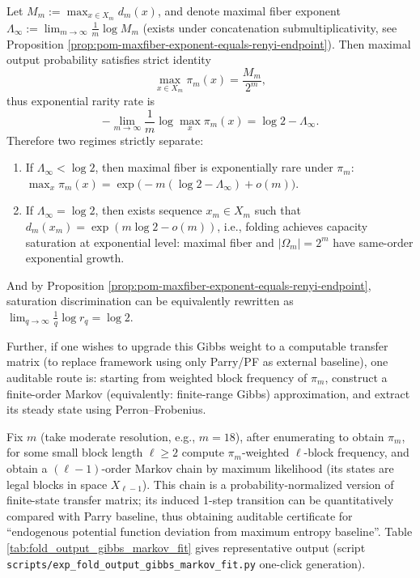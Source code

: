 \begin{proposition}\label{prop:pom-capacity-saturation-discriminant}
Let \(M_m:=\max_{x\in X_m}d_m(x)\), and denote maximal fiber exponent
\(
\Lambda_\infty:=\lim_{m\to\infty}\frac{1}{m}\log M_m
\)
(exists under concatenation submultiplicativity, see Proposition \ref{prop:pom-maxfiber-exponent-equals-renyi-endpoint}).
Then maximal output probability satisfies strict identity
\[
\max_{x\in X_m}\pi_m(x)=\frac{M_m}{2^m},
\]
thus exponential rarity rate is
\[
-\lim_{m\to\infty}\frac{1}{m}\log\max_x\pi_m(x)=\log 2-\Lambda_\infty.
\]
Therefore two regimes strictly separate:
\begin{enumerate}
  \item If \(\Lambda_\infty<\log 2\), then maximal fiber is exponentially rare under \(\pi_m\): \(\max_x\pi_m(x)=\exp\!\bigl(-m(\log 2-\Lambda_\infty)+o(m)\bigr)\).
  \item If \(\Lambda_\infty=\log 2\), then exists sequence \(x_m\in X_m\) such that \(d_m(x_m)=\exp(m\log 2-o(m))\), i.e., folding achieves capacity saturation at exponential level: maximal fiber and \(|\Omega_m|=2^m\) have same-order exponential growth.
\end{enumerate}
And by Proposition \ref{prop:pom-maxfiber-exponent-equals-renyi-endpoint}, saturation discrimination can be equivalently rewritten as
\(
\lim_{q\to\infty}\frac{1}{q}\log r_q=\log 2
\).
\end{proposition}

Further, if one wishes to upgrade this Gibbs weight to a computable transfer matrix (to replace framework using only Parry/PF as external baseline), one auditable route is: starting from weighted block frequency of \(\pi_m\), construct a finite-order Markov (equivalently: finite-range Gibbs) approximation, and extract its steady state using Perron--Frobenius.

\begin{remark}\label{rem:pom-gibbs-markov-fit}
Fix \(m\) (take moderate resolution, e.g., \(m=18\)), after enumerating to obtain \(\pi_m\), for some small block length \(\ell\ge 2\) compute \(\pi_m\)-weighted \(\ell\)-block frequency,
and obtain a \((\ell-1)\)-order Markov chain by maximum likelihood (its states are legal blocks in space \(X_{\ell-1}\)).
This chain is a probability-normalized version of finite-state transfer matrix; its induced 1-step transition can be quantitatively compared with Parry baseline, thus obtaining auditable certificate for ``endogenous potential function deviation from maximum entropy baseline''.
Table \ref{tab:fold_output_gibbs_markov_fit} gives representative output (script \texttt{scripts/exp\_fold\_output\_gibbs\_markov\_fit.py} one-click generation).
\end{remark}


